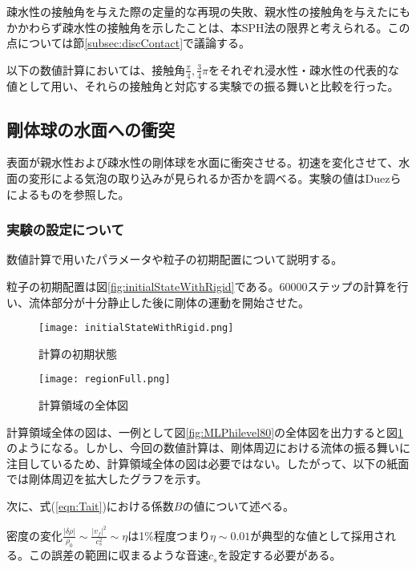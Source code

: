 \documentclass[]{jsarticle}
\begin{document}
疎水性の接触角を与えた際の定量的な再現の失敗、親水性の接触角を与えたにもかかわらず疎水性の接触角を示したことは、本SPH法の限界と考えられる。この点については節\ref{subsec:discContact}で議論する。

以下の数値計算においては、接触角$\frac{\pi}{4},\frac{3}{4}\pi$をそれぞれ浸水性・疎水性の代表的な値として用い、それらの接触角と対応する実験での振る舞いと比較を行った。


\newpage
\subsection{剛体球の水面への衝突}
\label{subsec:impact}
表面が親水性および疎水性の剛体球を水面に衝突させる。初速を変化させて、水面の変形による気泡の取り込みが見られるか否かを調べる。実験の値はDuez\cite{Duez2007}らによるものを参照した。

\subsubsection{実験の設定について}
数値計算で用いたパラメータや粒子の初期配置について説明する。

粒子の初期配置は図\ref{fig:initialStateWithRigid}である。60000ステップの計算を行い、流体部分が十分静止した後に剛体の運動を開始させた。

\begin{figure}[H]
  \centering
  \begin{minipage}{0.4\columnwidth}
    \centering
    \texttt{[image: initialStateWithRigid.png]}
    \caption{計算の初期状態\label{fig:initialStateWithRigid} }
  \end{minipage}
    \begin{minipage}{0.5\columnwidth}
    \centering
    \texttt{[image: regionFull.png]}
\caption{計算領域の全体図\label{fig:regionFull}}
  \end{minipage}
\end{figure}


計算領域全体の図は、一例として図\ref{fig:MLPhilevel80}の全体図を出力すると図\ref{fig:regionFull}のようになる。しかし、今回の数値計算は、剛体周辺における流体の振る舞いに注目しているため、計算領域全体の図は必要ではない。したがって、以下の紙面では剛体周辺を拡大したグラフを示す。

次に、式(\ref{eqn:Tait})における係数$B$の値について述べる。

密度の変化$\frac{\left| \delta \rho \right|}{\rho_0}\sim \frac{\left| v_f \right|^2}{c_s^2}\sim\eta$は1\%程度つまり$\eta\sim 0.01$が典型的な値として採用される\cite{Becker2007}。この誤差の範囲に収まるような音速$c_s$を設定する必要がある。
\end{document}
